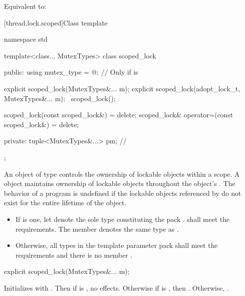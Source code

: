 \begin{itemdescr}
\pnum
\effects
Equivalent to: 
\end{itemdescr}

[thread.lock.scoped]{Class template }

%
\begin{codeblock}
namespace std {
  template<class... MutexTypes>
  class scoped_lock {
  public:
    using mutex_type = @\seebelow@;     // Only if  is 

    explicit scoped_lock(MutexTypes&... m);
    explicit scoped_lock(adopt_lock_t, MutexTypes&... m);
    ~scoped_lock();

    scoped_lock(const scoped_lock&) = delete;
    scoped_lock& operator=(const scoped_lock&) = delete;

  private:
    tuple<MutexTypes&...> pm;   // \expos
  };
}
\end{codeblock}

\pnum
An object of type  controls the ownership of lockable objects
within a scope. A  object maintains ownership of lockable
objects throughout the  object's .
The behavior of a program is undefined if the lockable objects referenced by
 do not exist for the entire lifetime of the 
object.
\begin{itemize}
\item
If  is one,
let  denote the sole type constituting the pack .
shall meet the  requirements.
The member  
denotes the same type as .
\item
Otherwise, all types in the template parameter pack 
shall meet the  requirements
and there is no member .
\end{itemize}

%
\begin{itemdecl}
explicit scoped_lock(MutexTypes&... m);
\end{itemdecl}

\begin{itemdescr}
\pnum
\effects
Initializes  with .
Then if  is , no effects.
Otherwise if  is , then .
Otherwise, .
\end{itemdescr}

